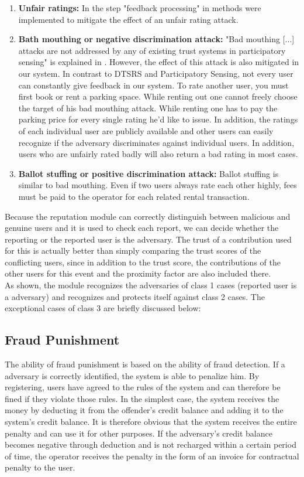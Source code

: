 \documentclass[
a4paper,     %
titlepage,   %
14pt         %
]{scrartcl}  %
\theoremstyle{mystyle}
\begin{document}
\begin{enumerate}
\item \textbf{Unfair ratings:} In the step "feedback processing" in \cite{mousa2017reputation} methods were implemented to mitigate the effect of an unfair rating attack.
\item \textbf{Bath mouthing or negative discrimination attack:} "Bad mouthing [...] attacks are not addressed by any of existing trust systems in participatory sensing" is explained in \cite{mousa2015trust}. However, the effect of this attack is also mitigated in our system. In contrast to DTSRS and Participatory Sensing, not every user can constantly give feedback in our system. To rate another user, you must first book or rent a parking space. While renting out one cannot freely choose the target of his bad mouthing attack. While renting one has to pay the parking price for every single rating he'd like to issue. In addition, the ratings of each individual user are publicly available and other users can easily recognize if the adversary discriminates against individual users. In addition, users who are unfairly rated badly will also return a bad rating in most cases.
\item \textbf{Ballot stuffing or positive discrimination attack:} Ballot stuffing is similar to bad mouthing. Even if two users always rate each other highly, fees must be paid to the operator for each related rental transaction.
\end{enumerate}

Because the reputation module can correctly distinguish between malicious and genuine users and it is used to check each report, we can decide whether the reporting or the reported user is the adversary. The trust of a contribution used for this is actually better than simply comparing the trust scores of the conflicting users, since in addition to the trust score, the contributions of the other users for this event and the proximity factor are also included there. \\

As shown, the module recognizes the adversaries of class 1 cases (reported user is a adversary) and recognizes and protects itself against class 2 cases. The exceptional cases of class 3 are briefly discussed below: 


\subsection{Fraud Punishment}
The ability of fraud punishment is based on the ability of fraud detection. If a adversary is correctly identified, the system is able to penalize him. By registering, users have agreed to the rules of the system and can therefore be fined if they violate those rules. In the simplest case, the system receives the money by deducting it from the offender's credit balance and adding it to the system's credit balance. It is therefore obvious that the system receives the entire penalty and can use it for other purposes. If the adversary's credit balance becomes negative through deduction and is not recharged within a certain period of time, the operator receives the penalty in the form of an invoice for contractual penalty to the user.
\end{document}
